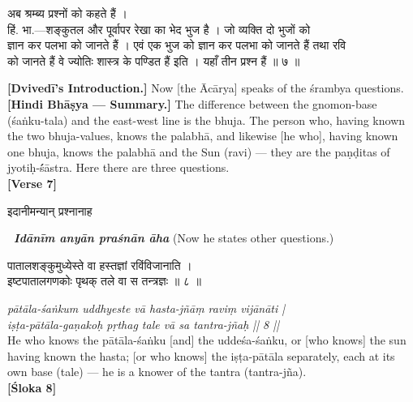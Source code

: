 \documentclass[11pt,a4paper]{article}
\newcommand{\dev}[1]{{\devanagarifont #1}}
\newcommand{\bilingualpair}[2]{%
  \noindent%
  \begin{minipage}[t]{0.48\textwidth}
    #1%
  \end{minipage}%
  \hfill%
  \begin{minipage}[t]{0.48\textwidth}
    #2%
  \end{minipage}%
  \par\vspace{0.5em}%
}
\newenvironment{sanskritcol}{\devanagarifont\small}{}
\newenvironment{englishcol}{\iastfont\small}{}
\begin{document}
\vspace{0.5cm}
\bilingualpair{%
\begin{sanskritcol}
\dev{अब श्रम्ब्य प्रश्नों को कहते हैं ।}\\[0.3em]
\dev{हिं. भा.---शङ्कुतल और पूर्वापर रेखा का भेद भुज है । जो व्यक्ति दो भुजों को}\\[0.3em]
\dev{ज्ञान कर पलभा को जानते हैं । एवं एक भुज को ज्ञान कर पलभा को जानते हैं तथा रवि}\\[0.3em]
\dev{को जानते हैं वे ज्योतिः शास्त्र के पण्डित हैं इति । यहाँ तीन प्रश्न हैं ॥ ७ ॥}
\end{sanskritcol}%
}{%
\begin{englishcol}
\textbf{[Dvivedī's Introduction.]} Now [the Ācārya] speaks of the \'srambya questions.\\[0.3em]
\textbf{[Hindi Bhāṣya --- Summary.]} The difference between the gnomon-\-base (\'saṅku-tala) and the east-\-west line is the bhuja. The person who, having known the two bhuja-\-values, knows the palabhā, and likewise [he who], having known one bhuja, knows the palabhā and the Sun (ravi) --- they are the paṇḍitas of jyotiḥ-\'śāstra. Here there are three questions.\\[0.3em]
\hfill \textbf{[Verse 7]}
\end{englishcol}%
}

\vspace{0.5cm}
\bilingualpair{%
\begin{sanskritcol}
\dev{इदानीमन्यान् प्रश्नानाह}
\end{sanskritcol}%
}{%
\begin{englishcol}
\textbf{\textbar\ \textit{Idānīm anyān praśnān āha}} (Now he states other questions.)
\end{englishcol}%
}

\vspace{0.3cm}
\bilingualpair{%
\begin{sanskritcol}
\dev{पातालशङ्कुमुध्येस्ते वा हस्तज्ञां रविंविजानाति ।}\\[0.3em]
\dev{इष्टपातालगणकोः पृथक् तले वा स तन्त्रज्ञः ॥ ८ ॥}
\end{sanskritcol}%
}{%
\begin{englishcol}
\textit{pātāla-\'saṅkum uddhyeste vā hasta-jñāṃ raviṃ vijānāti |}\\[0.3em]
\textit{iṣṭa-pātāla-gaṇakoḥ pṛthag tale vā sa tantra-jñaḥ || 8 ||}\\[0.3em]
He who knows the pātāla-\'saṅku [and] the uddeśa-\'saṅku, or [who knows] the sun having known the hasta; [or who knows] the iṣṭa-pātāla separately, each at its own base (tale) --- he is a knower of the tantra (tantra-jña).\\[0.3em]
\hfill \textbf{[Śloka 8]}
\end{englishcol}%
}
\end{document}
